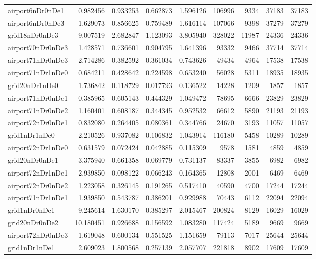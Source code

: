\begin{longtable}{|l|r|r|r|r|r|r|r|r|}
airport6nDr0nDe1 & 0.982456 & 0.933253 & 0.662873 & 1.596126 & 106996 & 9334 & 37183 & 37183 \\
airport6nDr0nDe3 & 1.629073 & 0.856625 & 0.759489 & 1.616114 & 107066 & 9398 & 37279 & 37279 \\
grid18nDr0nDe3 & 9.007519 & 2.682847 & 1.123093 & 3.805940 & 328022 & 11987 & 24336 & 24336 \\
airport70nDr0nDe3 & 1.428571 & 0.736601 & 0.904795 & 1.641396 & 93332 & 9466 & 37714 & 37714 \\
airport71nDr0nDe3 & 2.714286 & 0.382592 & 0.361034 & 0.743626 & 49434 & 4964 & 17538 & 17538 \\
airport71nDr1nDe0 & 0.684211 & 0.428642 & 0.224598 & 0.653240 & 56028 & 5311 & 18935 & 18935 \\
grid20nDr1nDe0 & 1.736842 & 0.118729 & 0.017793 & 0.136522 & 14228 & 1209 & 1857 & 1857 \\
airport71nDr0nDe1 & 0.385965 & 0.605143 & 0.444329 & 1.049472 & 78695 & 6666 & 23829 & 23829 \\
airport71nDr0nDe2 & 1.160401 & 0.608187 & 0.344345 & 0.952532 & 66612 & 5890 & 21193 & 21193 \\
airport72nDr0nDe1 & 0.832080 & 0.264405 & 0.080361 & 0.344766 & 24670 & 3193 & 11057 & 11057 \\
grid1nDr1nDe0 & 2.210526 & 0.937082 & 0.106832 & 1.043914 & 116180 & 5458 & 10289 & 10289 \\
airport72nDr1nDe0 & 0.631579 & 0.072424 & 0.042885 & 0.115309 & 9578 & 1581 & 4859 & 4859 \\
grid20nDr0nDe1 & 3.375940 & 0.661358 & 0.069779 & 0.731137 & 83337 & 3855 & 6982 & 6982 \\
airport72nDr1nDe1 & 2.939850 & 0.098122 & 0.066243 & 0.164365 & 12808 & 2001 & 6469 & 6469 \\
airport72nDr0nDe2 & 1.223058 & 0.326145 & 0.191265 & 0.517410 & 40590 & 4700 & 17244 & 17244 \\
airport71nDr1nDe1 & 1.939850 & 0.543787 & 0.386201 & 0.929988 & 70443 & 6112 & 22094 & 22094 \\
grid1nDr0nDe1 & 9.245614 & 1.630170 & 0.385297 & 2.015467 & 200824 & 8129 & 16029 & 16029 \\
grid20nDr0nDe2 & 10.180451 & 0.926688 & 0.156592 & 1.083280 & 117424 & 5189 & 9669 & 9669 \\
airport72nDr0nDe3 & 1.619048 & 0.600134 & 0.551525 & 1.151659 & 79113 & 7017 & 25644 & 25644 \\
grid1nDr1nDe1 & 2.609023 & 1.800568 & 0.257139 & 2.057707 & 221818 & 8902 & 17609 & 17609 \\

\end{longtable}

